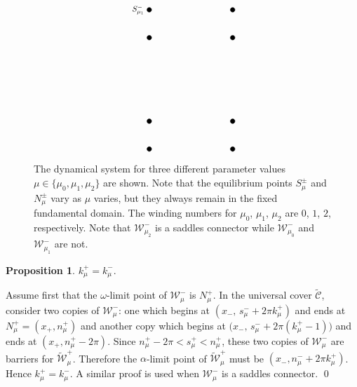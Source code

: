 \documentclass[11 pt]{article}
\newtheorem{prop}[thm]{Proposition}%
\renewcommand\({\left(}
\renewcommand\){\right)}
\newcommand\wt{\widetilde}
\newcommand\<{\langle}
\renewcommand\>{\rangle}
\newcommand\8{\infty}
\renewcommand\a{\alpha}
\newcommand{\mc}{\mathcal}
\begin{document}
\begin{figure}[h]
\[\begin{tikzpicture}[scale = 0.50]
\node [scale = .50] [circle, draw, fill = black] at (-3,-5)  {};
\node [scale = .50] [circle, draw, fill = black] at (-3,-3)  {};
\node [scale = .50] [circle, draw, fill = black] at (3,-5)  {};
\node [scale = .50] [circle, draw, fill = black] at (3,-3)  {};

\node [scale = .50] [circle, draw, fill = black] at (-3,3)  {};
\node [scale = .50] [circle, draw, fill = black] at (-3,5)  {};
\node [scale = .50] [circle, draw, fill = black] at (3,3)  {};
\node [scale = .50] [circle, draw, fill = black] at (3,5)  {};


\draw (-3.8,5) node [scale = .8] {$S^-_{\mu_1}$};










\end{tikzpicture}
\]
\captionsetup{format=hang}
\caption{\small{The dynamical system for three different parameter values $\mu \in \{\mu_0, \mu_1, \mu_2\}$ are shown. Note that the equilibrium points $S^\pm_\mu$ and $N^\pm_\mu$ vary as $\mu$ varies, but they always remain in the fixed fundamental domain. The winding numbers for $\mu_0$, $\mu_1$, $\mu_2$ are $0$, $1$, $2$, respectively. Note that $\mc{W}^-_{\mu_2}$ is a saddles connector while $\mc{W}^-_{\mu_0}$ and $\mc{W}^-_{\mu_1}$ are not. }}
\end{figure}








\begin{prop}\label{eq k prop}
$k^+_\mu = k^-_\mu.$
\end{prop}


\proof Assume first that the $\omega$-limit point of $\mc{W}^-_\mu$ is $N^+_\mu$. In the universal cover $\wt{\mc{C}}$, consider two copies of $\mc{W}^-_\mu$: one which begins at $(x_-,\, s^-_\mu + 2\pi k^+_\mu)$ and ends at $N^+_\mu = (x_+, n^+_\mu)$ and another copy which begins at $\big(x_-, \, s^-_\mu + 2\pi (k^+_\mu - 1)\big)$ and ends at $(x_+, n^+_\mu - 2\pi)$. Since $n^+_\mu - 2\pi < s^+_\mu < n^+_\mu$, these two copies of $\mc{W}^-_\mu$ are barriers for $\wt{\mc{W}}^+_\mu$. Therefore the $\a$-limit point of $\wt{\mc{W}}^+_\mu$ must be $(x_-, n^-_\mu + 2\pi k^+_\mu)$. Hence $k^+_\mu = k^-_\mu$. A similar proof is used when $\mc{W}^-_\mu$ is a saddles connector. 
\qed
\end{document}
